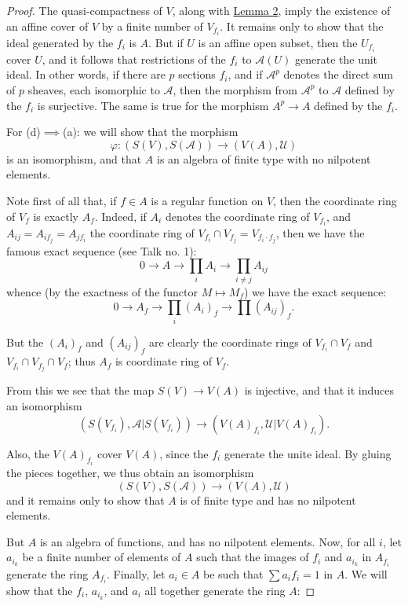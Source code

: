 \documentclass[british]{article}
\newcommand{\oldpage}[1]{\marginpar{\footnotesize$\Big\vert$ \textit{p.~#1}}}
\begin{document}
\begin{proof}
The quasi-compactness of \(V\), along with \hyperref[lemma-2]{Lemma 2},
imply the existence of an affine cover of \(V\) by a finite number of
\(V_{f_i}\). It remains only to show that the ideal generated by the
\(f_i\) is \(A\). But if \(U\) is an affine open subset, then the
\(U_{f_i}\) cover \(U\), and it follows that restrictions of the \(f_i\)
to \({\mathscr{A}}(U)\) generate the unit ideal. In other words, if
there are \(p\) sections \(f_i\), and if \({\mathscr{A}}^p\) denotes the
direct sum of \(p\) sheaves, each isomorphic to \({\mathscr{A}}\), then
the morphism from \({\mathscr{A}}^p\) to \({\mathscr{A}}\) defined by
the \(f_i\) is surjective. The same is true for the morphism
\(A^p\to A\) defined by the \(f_i\).

\bigskip

For (d)\(\implies\)(a): we will show that the morphism \[
  \varphi\colon (S(V),S({\mathscr{A}})) \to (V(A),{\mathscr{U}})
\] is an isomorphism, and that \(A\) is an algebra of finite type with
no nilpotent elements.

Note first of all that, if \(f\in A\) is a regular function on \(V\),
then the coordinate ring of \(V_f\) is exactly \(A_f\). Indeed, if
\(A_i\) denotes the coordinate ring of \(V_{f_i}\), and
\(A_{ij}=A_{if_j}=A_{jf_i}\) the coordinate ring of
\(V_{f_i}\cap V_{f_j}=V_{f_i\cdot f_j}\), then we have the famous exact
sequence (see Talk no. 1): \[
  0 \to A \to \prod_i A_i \to \prod_{i\neq j}A_{ij}
\] whence (by the exactness of the functor \(M\mapsto M_f\)) we have the
exact sequence: \[
  0 \to A_f \to \prod_i(A_i)_f \to \prod(A_{ij})_f.
\]

But the \((A_i)_f\) and \((A_{ij})_f\) are clearly the coordinate rings
of \(V_{f_i}\cap V_f\) and \(V_{f_i}\cap V_{f_j}\cap V_f\); thus \(A_f\)
is coordinate ring of \(V_f\). \oldpage{2-07}

From this we see that the map \(S(V)\to V(A)\) is injective, and that it
induces an isomorphism \[
  (S(V_{f_i}), {\mathscr{A}}|S(V_{f_i})) \to (V(A)_{f_i}, {\mathscr{U}}|V(A)_{f_i}).
\]

Also, the \(V(A)_{f_i}\) cover \(V(A)\), since the \(f_i\) generate the
unite ideal. By gluing the pieces together, we thus obtain an
isomorphism \[
  (S(V),S({\mathscr{A}})) \to (V(A),{\mathscr{U}})
\] and it remains only to show that \(A\) is of finite type and has no
nilpotent elements.

But \(A\) is an algebra of functions, and has no nilpotent elements.
Now, for all \(i\), let \(a_{i_k}\) be a finite number of elements of
\(A\) such that the images of \(f_i\) and \(a_{i_k}\) in \(A_{f_i}\)
generate the ring \(A_{f_i}\). Finally, let \(a_i\in A\) be such that
\(\sum a_i f_i=1\) in \(A\). We will show that the \(f_i\), \(a_{i_k}\),
and \(a_i\) all together generate the ring \(A\):


\end{proof}
\end{document}
